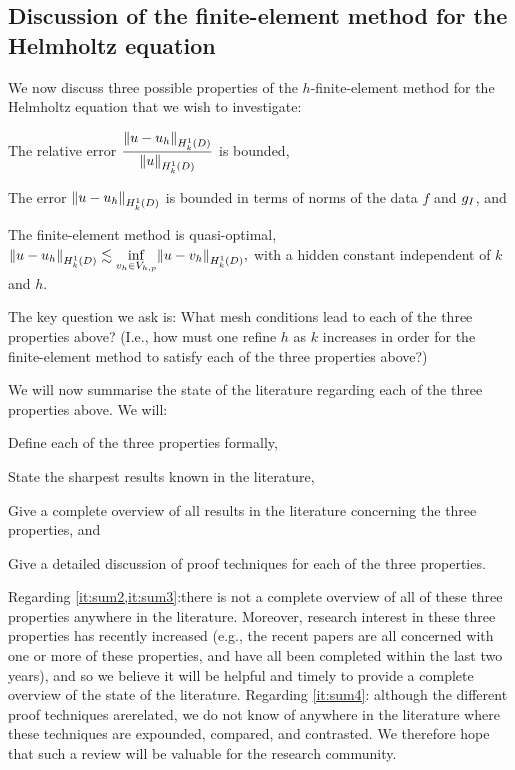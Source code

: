 \subsection{Discussion of the finite-element method for the Helmholtz equation}\label{sec:helmfedisc}

We now discuss three possible properties of the $h$-finite-element method for the Helmholtz equation that we wish to investigate:
\bit
\item The relative error $\displaystyle \frac{\NHokD{u-\uh}}{\NHokD{u}}$ is bounded,
\item The error $\NHokD{u-\uh}$ is bounded in terms of norms of the data $f$ and $g_{I}$, and
  \item The finite-element method is quasi-optimal, $\displaystyle \NHokD{u-\uh} \lesssim \inf_{\vh \in \Vhp} \NHokD{u-\vh},$
    \eit
    with a hidden constant independent of $k$ and $h.$

    The key question we ask is: What mesh conditions lead to each of the three properties above? (I.e., how must one refine $h$ as $k$ increases in order for the finite-element method to satisfy each of the three properties above?)

    We will now summarise the state of the literature regarding each of the three properties above. We will:
    \ben
  \item Define each of the three properties formally,
  \item\label{it:sum2} State the sharpest results known in the literature,
  \item\label{it:sum3} Give a complete overview of all results in the literature concerning the three properties, and
    \item\label{it:sum4} Give a detailed discussion of proof techniques for each of the three properties.
      \een

Regarding \cref{it:sum2,it:sum3}:there is not a complete overview of all of these three properties anywhere in the literature. Moreover, research interest in these three properties has recently increased (e.g., the recent papers \cite{ChNi:18,ChGaNiTo:18,ChNi:19,LiWu:19} are all concerned with one or more of these properties, and have all been completed within the last two years), and so we believe it will be helpful and timely to provide a complete overview of the state of the literature. Regarding \cref{it:sum4}: although the different proof techniques arerelated, we do not know of anywhere in the literature where these techniques are expounded, compared, and contrasted. We therefore hope that such a review will be valuable for the research community.

